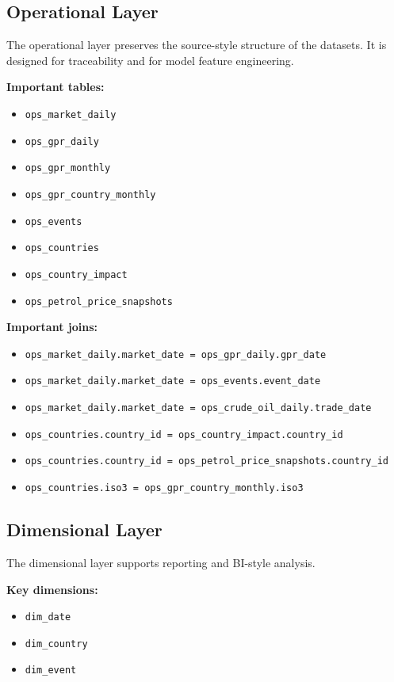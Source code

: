 \documentclass[conference]{IEEEtran}
\begin{document}
\subsection{Operational Layer}

The operational layer preserves the source-style structure of the datasets. It is designed for traceability and for model feature engineering.

\textbf{Important tables:}
\begin{itemize}
  \item \texttt{ops\_market\_daily}
  \item \texttt{ops\_gpr\_daily}
  \item \texttt{ops\_gpr\_monthly}
  \item \texttt{ops\_gpr\_country\_monthly}
  \item \texttt{ops\_events}
  \item \texttt{ops\_countries}
  \item \texttt{ops\_country\_impact}
  \item \texttt{ops\_petrol\_price\_snapshots}
\end{itemize}

\textbf{Important joins:}
\begin{itemize}
  \item \texttt{ops\_market\_daily.market\_date = ops\_gpr\_daily.gpr\_date}
  \item \texttt{ops\_market\_daily.market\_date = ops\_events.event\_date}
  \item \texttt{ops\_market\_daily.market\_date = ops\_crude\_oil\_daily.trade\_date}
  \item \texttt{ops\_countries.country\_id = ops\_country\_impact.country\_id}
  \item \texttt{ops\_countries.country\_id = ops\_petrol\_price\_snapshots.country\_id}
  \item \texttt{ops\_countries.iso3 = ops\_gpr\_country\_monthly.iso3}
\end{itemize}

\subsection{Dimensional Layer}

The dimensional layer supports reporting and BI-style analysis.

\textbf{Key dimensions:}
\begin{itemize}
  \item \texttt{dim\_date}
  \item \texttt{dim\_country}
  \item \texttt{dim\_event}
\end{itemize}
\end{document}
